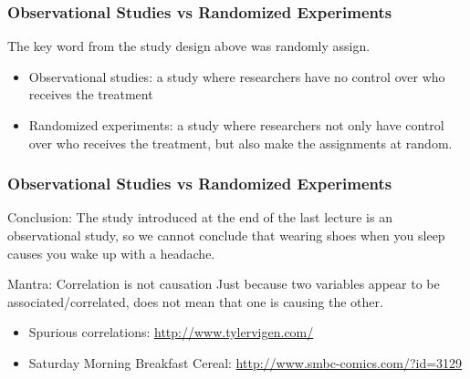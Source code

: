 \documentclass[handout]{beamer}
\newcommand{\blue}[1]{\textcolor{blue2}{#1}}
\begin{document}
\begin{frame}
\frametitle{Observational Studies vs Randomized Experiments}
The key word from the study design above was \blue{randomly assign}.

\begin{itemize}
  \pause\item \blue{Observational studies}: a study where researchers have \blue{no control} over who receives the treatment
  \pause\item \blue{Randomized experiments}: a study where researchers not only have control over who receives the treatment, but also make the assignments \blue{at random}.
\end{itemize}

\end{frame}


\begin{frame}
\frametitle{Observational Studies vs Randomized Experiments}

\blue{Conclusion}:  The study introduced at the end of the last lecture is an \blue{observational study}, so we cannot conclude that wearing shoes when you sleep \blue{causes} you wake up with a headache.

\vspace{0.25in}

\pause\blue{Mantra}:  \blue{Correlation is not causation}  Just because two variables appear to be associated/correlated, does not mean that one is \blue{causing the other}.

\vspace{0.25in}

\begin{itemize}
\item Spurious correlations:  \blue{\href{http://www.tylervigen.com/view\_correlation?id=1582}{http://www.tylervigen.com/}}
\item Saturday Morning Breakfast Cereal:  \blue{\href{http://www.smbc-comics.com/?id=3129}{http://www.smbc-comics.com/?id=3129}}
\end{itemize}



\end{frame}
\end{document}
